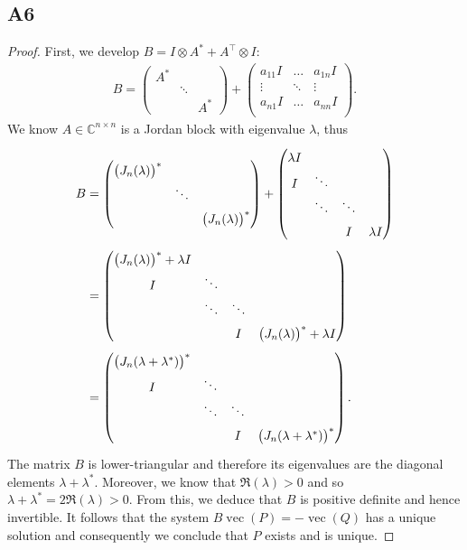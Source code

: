 \documentclass[11pt]{article}
\newcommand{\kp}{\otimes}
\DeclareMathOperator{\vect}{vec}
\newcommand{\complex}{\mathbb{C}} %
\begin{document}
\subsection*{A6}
\begin{proof}
First, we develop $B=I\kp A^*+A^\top\kp I$:
\begin{align*}
    B=
    \begin{pmatrix}
    A^* & & \\
    &\ddots&\\
    & & A^*
    \end{pmatrix}+
    \begin{pmatrix}
    a_{11} I & \dots & a_{1n} I\\
    \vdots & \ddots & \vdots\\
    a_{n1} I & \dots & a_{nn} I\\
    \end{pmatrix}.
\end{align*}
We know $A\in\complex^{n\times n}$ is a Jordan block with eigenvalue $\lambda$, thus
\begin{align*}
    B&=
    \renewcommand{\arraystretch}{1.5}
    \begin{pmatrix}
    \big(J_n(\lambda)\big)^* & & \\
    &\ddots&\\
    & & \big(J_n(\lambda)\big)^*
    \end{pmatrix}+
    \begin{pmatrix}
    \lambda I & & &\\
    I & \ddots & &\\
    & \ddots & \ddots &\\
    & & I & \lambda I
    \end{pmatrix}\\
    &=\begin{pmatrix}
    \big(J_n(\lambda)\big)^*+\lambda I &  &  & \\
    I & \ddots & &\\
    & \ddots & \ddots &\\
    & & I & \big(J_n(\lambda)\big)^*+\lambda I
    \end{pmatrix}\\
    &=\begin{pmatrix}
    \big(J_n(\lambda+\lambda^*)\big)^* & & & \\
    I & \ddots & &\\
    & \ddots & \ddots &\\
    & & I & \big(J_n(\lambda+\lambda^*)\big)^*
    \end{pmatrix}.
\end{align*}
The matrix \(B\) is lower-triangular and therefore its eigenvalues are the diagonal elements $\lambda+\lambda^*$.
Moreover, we know that $\Re(\lambda)>0$ and so $\lambda+\lambda^*=2 \Re(\lambda)>0$.
From this, we deduce that $B$ is positive definite and hence invertible.
It follows that the system $B\vect(P)=-\vect(Q)$ has a unique solution and consequently we conclude that \(P\) exists and is unique.
\end{proof}
\end{document}
